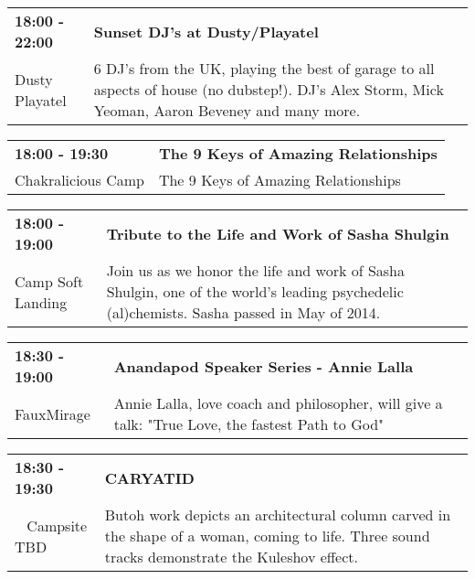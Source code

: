 \begin{tabular}{ p{1in} p{2.2in} }
    \textbf{18:00 - 22:00} & \textbf{Sunset DJ's at Dusty/Playatel} \\
    Dusty Playatel \newline  & 6 DJ's from the UK, playing the best of garage to all aspects of house (no dubstep!). DJ's Alex Storm, Mick Yeoman, Aaron Beveney and many more. \\
    \hline 
\end{tabular}
    
\begin{tabular}{ p{1in} p{2.2in} }
    \textbf{18:00 - 19:30} & \textbf{The 9 Keys of Amazing Relationships} \\
    Chakralicious Camp \newline  & The 9 Keys of Amazing Relationships \\
    \hline 
\end{tabular}
    
\begin{tabular}{ p{1in} p{2.2in} }
    \textbf{18:00 - 19:00} & \textbf{Tribute to the Life and Work of Sasha Shulgin} \\
    Camp Soft Landing \newline  & Join us as we honor the life and work of Sasha Shulgin, one of the world's leading psychedelic (al)chemists. Sasha passed in May of 2014. \\
    \hline 
\end{tabular}
    
\begin{tabular}{ p{1in} p{2.2in} }
    \textbf{18:30 - 19:00} & \textbf{Anandapod Speaker Series - Annie Lalla} \\
    FauxMirage \newline  & Annie Lalla, love coach and philosopher, will give a talk: "True Love, the fastest Path to God" \\
    \hline 
\end{tabular}
    
\begin{tabular}{ p{1in} p{2.2in} }
    \textbf{18:30 - 19:30} & \textbf{CARYATID} \\
    ~ \newline Campsite TBD & Butoh work depicts an architectural column carved in the shape of a woman, coming to life. Three sound tracks demonstrate the Kuleshov effect. \\
    \hline 
\end{tabular}
    
